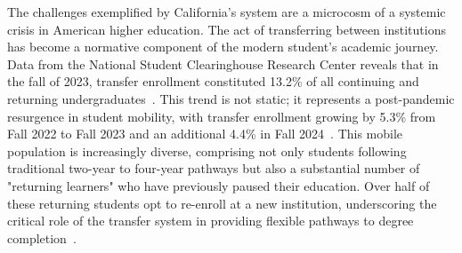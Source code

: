 \begin{introduction}
The challenges exemplified by California's system are a microcosm of a systemic crisis in American higher education. The act of transferring between institutions has become a normative component of the modern student's academic journey. Data from the National Student Clearinghouse Research Center reveals that in the fall of 2023, transfer enrollment constituted 13.2\% of all continuing and returning undergraduates~\cite{nscnews2023}. This trend is not static; it represents a post-pandemic resurgence in student mobility, with transfer enrollment growing by 5.3\% from Fall 2022 to Fall 2023 and an additional 4.4\% in Fall 2024~\cite{nscnews2023,nscnews20250305}. This mobile population is increasingly diverse, comprising not only students following traditional two-year to four-year pathways but also a substantial number of "returning learners" who have previously paused their education. Over half of these returning students opt to re-enroll at a new institution, underscoring the critical role of the transfer system in providing flexible pathways to degree completion~\cite{nscdd20250507}.


\end{introduction}
